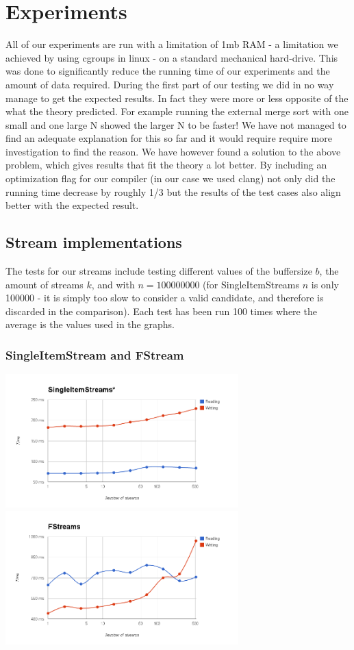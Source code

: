 \section{Experiments}

All of our experiments are run with a limitation of 1mb RAM - a limitation we achieved by using cgroups in linux - on a standard mechanical hard-drive. This was done to significantly reduce the running time of our experiments and the amount of data required. 
During the first part of our testing we did in no way manage to get the expected results. In fact they were more or less opposite of the what the theory predicted. For example running the external merge sort with one small and one large N showed the larger N to be faster! We have not managed to find an adequate explanation for this so far and it would require require more investigation to find the reason.
We have however found a solution to the above problem, which gives results that fit the theory a lot better. By including an optimization flag for our compiler (in our case we used clang) not only did the running time decrease by roughly 1/3 but the results of the test cases also align better with the expected result. 

\subsection{Stream implementations}
The tests for our streams include testing different values of the buffersize $b$, the amount of streams $k$, and with $n = 100000000$ (for SingleItemStreams $n$ is only 100000 - it is simply too slow to consider a valid candidate, and therefore is discarded in the comparison). 
Each test has been run 100 times where the average is the values used in the graphs. 

\subsubsection{SingleItemStream and FStream}
\includegraphics[width=90mm]{graphics/SIS.png}
\includegraphics[width=90mm]{graphics/FS.png}

